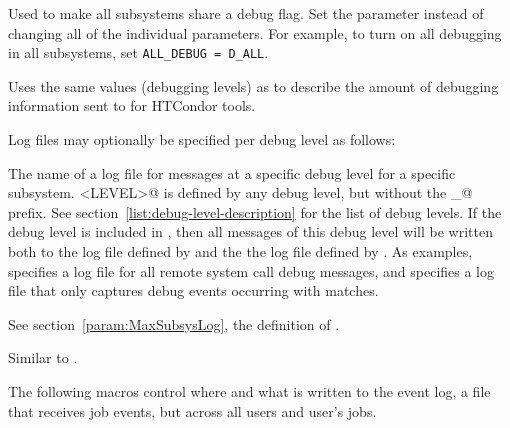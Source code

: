 \begin{description}
\begin{description}
  \end{description}

\label{param:AllDebug}
\item[\Macro{ALL\_DEBUG}]
  Used to make all subsystems
  share a debug flag. Set the parameter 
  instead of changing all of the individual parameters.  For example,
  to turn on all debugging in all subsystems, set
  \verb$ALL_DEBUG = D_ALL$.

\label{param:ToolDebug}
\item[\Macro{TOOL\_DEBUG}]
  Uses the same values (debugging levels) as  to
  describe the amount of debugging information sent to  
  for HTCondor tools.

\end{description}

Log files may optionally be specified per debug level as follows:
\begin{description}

\label{param:SubsysLevelLog}
\item[\MacroB{<SUBSYS>\_<LEVEL>\_LOG}]
  The name of a log file for messages at a specific debug level for a
  specific subsystem.  
  \verb@<LEVEL>@ is defined by any debug level,
  but without the \verb@D_@ prefix.
  See section~\ref{list:debug-level-description} for the list of debug levels.
  If the debug level is included in
  , then all messages of this debug level will be
  written both to the log file defined by  and the
  the log file defined by .  As examples,
   specifies a log file for all remote
  system call debug messages,
  and  specifies a log file that only captures
   debug events occurring with matches.

\label{param:MaxSubsysLevelLog}
\item[\Macro{MAX\_<SUBSYS>\_<LEVEL>\_LOG}]
  See section~\ref{param:MaxSubsysLog}, the definition of
  .

\label{param:TruncSubsysLevelLogOnOpen}
\item[\Macro{TRUNC\_<SUBSYS>\_<LEVEL>\_LOG\_ON\_OPEN}]
  Similar to .

\end{description}

The following macros control where and what is written to the 
event log,
a file that receives job events, 
but across all users and user's jobs.

